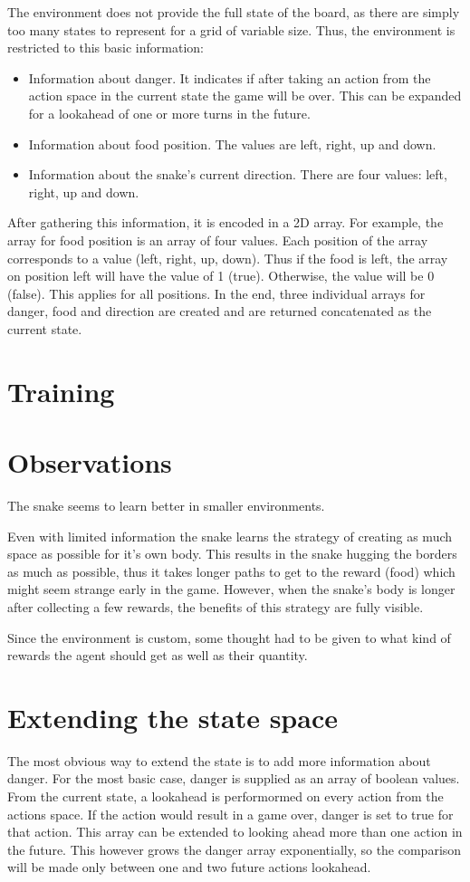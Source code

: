 \documentclass[lettersize,journal]{IEEEtran}
\begin{document}
The environment does not provide the full state of the board,
as there are simply too many states to represent for a grid
of variable size. Thus, the environment is restricted to
this basic information:
\begin{itemize}
    \item Information about danger. It indicates if after taking an action from the action space in the current state
        the game will be over. This can be expanded for a lookahead of one or more turns in the future.
    \item Information about food position. The values are left, right, up and down.
    \item Information about the snake's current direction. There are four values: left, right, up and down.
\end{itemize}

After gathering this information, it is encoded in a 2D array. For example, the array for food position
is an array of four values. Each position of the array corresponds to a value (left, right, up, down).
Thus if the food is left, the array on position left will have the value of 1 (true). Otherwise, the
value will be 0 (false). This applies for all positions. In the end, three individual arrays for danger,
food and direction are created and are returned concatenated as the current state.

\section{Training}

\section{Observations}
The snake seems to learn better in smaller environments.

Even with limited information the snake learns the strategy
of creating as much space as possible for it's own body.
This results in the snake hugging the borders as much
as possible, thus it takes longer paths to get to the reward (food) which
might seem strange early in the game.
However, when the snake's body is longer after collecting a
few rewards, the benefits of this strategy are fully visible.


Since the environment is custom, some thought had to be given
to what kind of rewards the agent should get as well as their
quantity.


\section{Extending the state space}
The most obvious way to extend the state is to add more
information about danger. For the most basic case, danger
is supplied as an array of boolean values. From the current
state, a lookahead is performormed on every action from
the actions space. If the action would result in a game
over, danger is set to true for that action. This
array can be extended to looking ahead more than one action
in the future. This however grows the danger array
exponentially, so the comparison will be made only between
one and two future actions lookahead.
\end{document}
